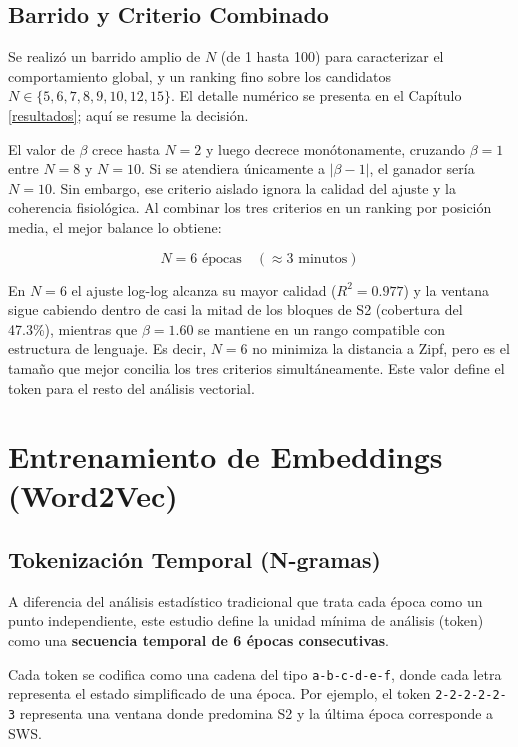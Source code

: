 \subsection{Barrido y Criterio Combinado}

Se realizó un barrido amplio de $N$ (de 1 hasta 100) para caracterizar el comportamiento global, y un ranking fino sobre los candidatos $N \in \{5,6,7,8,9,10,12,15\}$. El detalle numérico se presenta en el Capítulo \ref{resultados}; aquí se resume la decisión.

El valor de $\beta$ crece hasta $N=2$ y luego decrece monótonamente, cruzando $\beta = 1$ entre $N=8$ y $N=10$. Si se atendiera únicamente a $|\beta - 1|$, el ganador sería $N=10$. Sin embargo, ese criterio aislado ignora la calidad del ajuste y la coherencia fisiológica. Al combinar los tres criterios en un ranking por posición media, el mejor balance lo obtiene:

\begin{equation}
    N = 6 \text{ épocas} \quad (\approx 3 \text{ minutos})
    \label{eq:ventana}
\end{equation}

En $N=6$ el ajuste log-log alcanza su mayor calidad ($R^2 = 0.977$) y la ventana sigue cabiendo dentro de casi la mitad de los bloques de S2 (cobertura del 47.3\%), mientras que $\beta = 1.60$ se mantiene en un rango compatible con estructura de lenguaje. Es decir, $N=6$ no minimiza la distancia a Zipf, pero es el tamaño que mejor concilia los tres criterios simultáneamente. Este valor define el token para el resto del análisis vectorial.

\section{Entrenamiento de Embeddings (Word2Vec)}

\subsection{Tokenización Temporal (N-gramas)}

A diferencia del análisis estadístico tradicional que trata cada época como un punto independiente, este estudio define la unidad mínima de análisis (token) como una \textbf{secuencia temporal de 6 épocas consecutivas}.

Cada token se codifica como una cadena del tipo \texttt{a-b-c-d-e-f}, donde cada letra representa el estado simplificado de una época. Por ejemplo, el token \texttt{2-2-2-2-2-3} representa una ventana donde predomina S2 y la última época corresponde a SWS.

